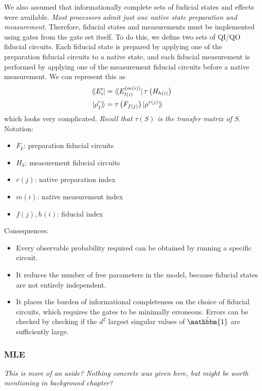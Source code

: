 We also assumed that informationally complete sets of fudicial states and effects were available.
\textit{Most processors admit just one native state preparation and measurement}. Therefore,
fiducial states and measurements must be implemented using gates from the gate set itself. To do
this, we define two sets of QI/QO fiducial circuits. Each fiducial state is prepared by applying one
of the preparation fiducial circuits to a native state, and each fiducial measurement is performed
by applying one of the measurement fiducial circuits before a native measurement. We can represent
this as
\begin{align}
    \langle\!\bra{E_i'}    &= \langle\!\bra{E_{t(i)}^{(m(i))}} \tau \left(H_{h(i)}\right) \\
    \ket{\rho_j'}\!\rangle &= \tau \left(F_{f(j)}\right) \ket{\rho^{r(j)}}\!\rangle
\end{align}
which looks very complicated. \textit{Recall that $\tau(S)$ is the transfer matrix of $S$}.
Notation:
\begin{itemize}
    \item $F_k$: preparation fiducial circuits
    \item $H_k$: measurement fiducial circuits
    \item $r(j)$: native preparation index
    \item $m(i)$: native measurement index
    \item $f(j), h(i)$: fiducial index
\end{itemize}
Consequences:
\begin{itemize}
    \item Every observable probability required can be obtained by running a specific circuit.
    \item It reduces the number of free parameters in the model, because fiducial states are not
    entirely independent.
    \item It places the burden of informational completeness on the choice of fiducial circuits,
    which requires the gates to be minimally erroneous. Errors can be checked by checking if the
    $d^2$ largest singular values of $\tilde{\mathbbm{1}}$ are sufficiently large.
\end{itemize}

\subsubsection{MLE}

\textit{This is more of an aside? Nothing concrete was given here, but might be worth mentioning 
in background chapter?}

